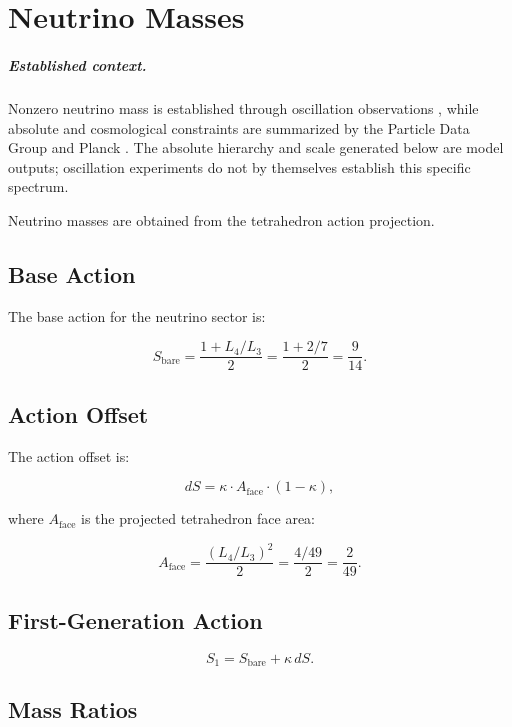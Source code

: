 \chapter{Neutrino Masses}
\label{ch:neutrino_masses}


\paragraph{Established context.}
Nonzero neutrino mass is established through oscillation observations
\cite{SuperK1998,SNO2002,KamLAND2003,DayaBay2012}, while absolute and cosmological
constraints are summarized by the Particle Data Group and Planck
\cite{PDG2024,Planck2018}.  The absolute hierarchy and scale generated below are
model outputs; oscillation experiments do not by themselves establish this
specific spectrum.

Neutrino masses are obtained from the tetrahedron action projection.

\section{Base Action}

The base action for the neutrino sector is:

\[
S_{\text{bare}} = \frac{1 + L_4/L_3}{2} = \frac{1 + 2/7}{2} = \frac{9}{14}.
\]

\section{Action Offset}

The action offset is:

\[
dS = \kappa \cdot A_{\text{face}} \cdot (1-\kappa),
\]

where \(A_{\text{face}}\) is the projected tetrahedron face area:

\[
A_{\text{face}} = \frac{(L_4/L_3)^2}{2} = \frac{4/49}{2} = \frac{2}{49}.
\]

\section{First-Generation Action}

\[
S_1 = S_{\text{bare}} + \kappa\,dS.
\]

\section{Mass Ratios}

